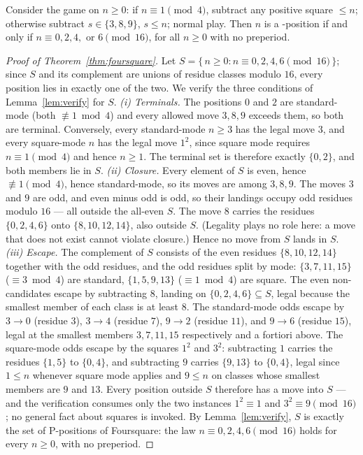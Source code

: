 \begin{theorem}[Foursquare]\label{thm:foursquare}
Consider the game on $n \ge 0$: if $n \equiv 1 \pmod 4$, subtract any
positive square $\le n$; otherwise subtract $s \in \{3,8,9\}$, $s \le n$;
normal play. Then $n$ is a \PP-position if and only if
$n \equiv 0, 2, 4,$ or $6 \pmod{16}$, for all $n \ge 0$ with no
preperiod.
\end{theorem}

\begin{proof}[Proof of Theorem~\ref{thm:foursquare}]
Let $S = \{\, n \ge 0 : n \equiv 0, 2, 4, 6 \pmod{16} \,\}$; since $S$ and
its complement are unions of residue classes modulo $16$, every position
lies in exactly one of the two. We verify the three conditions of
Lemma~\ref{lem:verify} for $S$.
\emph{(i) Terminals.} The positions $0$ and $2$ are standard-mode (both
$\not\equiv 1 \bmod 4$) and every allowed move $3, 8, 9$ exceeds them, so
both are terminal. Conversely, every standard-mode $n \ge 3$ has the legal
move $3$, and every square-mode $n$ has the legal move $1^2$, since square
mode requires $n \equiv 1 \pmod 4$ and hence $n \ge 1$. The terminal set is
therefore exactly $\{0, 2\}$, and both members lie in $S$.
\emph{(ii) Closure.} Every element of $S$ is even, hence
$\not\equiv 1 \pmod 4$, hence standard-mode, so its moves are among
$3, 8, 9$. The moves $3$ and $9$ are odd, and even minus odd is odd, so
their landings occupy odd residues modulo $16$ --- all outside the all-even
$S$. The move $8$ carries the residues $\{0, 2, 4, 6\}$ onto
$\{8, 10, 12, 14\}$, also outside $S$. (Legality plays no role here: a move
that does not exist cannot violate closure.) Hence no move from $S$ lands
in $S$.
\emph{(iii) Escape.} The complement of $S$ consists of the even residues
$\{8, 10, 12, 14\}$ together with the odd residues, and the odd residues
split by mode: $\{3, 7, 11, 15\}$ ($\equiv 3 \bmod 4$) are standard,
$\{1, 5, 9, 13\}$ ($\equiv 1 \bmod 4$) are square. The even non-candidates
escape by subtracting $8$, landing on $\{0, 2, 4, 6\} \subseteq S$, legal
because the smallest member of each class is at least $8$. The
standard-mode odds escape by $3 \to 0$ (residue $3$), $3 \to 4$ (residue
$7$), $9 \to 2$ (residue $11$), and $9 \to 6$ (residue $15$), legal at the
smallest members $3, 7, 11, 15$ respectively and a fortiori above. The
square-mode odds escape by the squares $1^2$ and $3^2$: subtracting $1$
carries the residues $\{1, 5\}$ to $\{0, 4\}$, and subtracting $9$ carries
$\{9, 13\}$ to $\{0, 4\}$, legal since $1 \le n$ whenever square mode
applies and $9 \le n$ on classes whose smallest members are $9$ and $13$.
Every position outside $S$ therefore has a move into $S$ --- and the
verification consumes only the two instances $1^2 \equiv 1$ and
$3^2 \equiv 9 \pmod{16}$; no general fact about squares is invoked.
By Lemma~\ref{lem:verify}, $S$ is exactly the set of P-positions of
Foursquare: the law $n \equiv 0, 2, 4, 6 \pmod{16}$ holds for every
$n \ge 0$, with no preperiod.
\end{proof}

